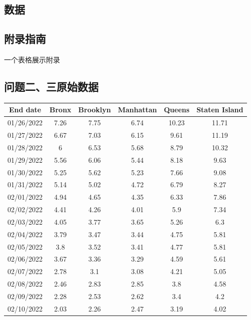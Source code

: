 \documentclass[withoutpreface,bwprint]{cumcmthesis} %
\begin{document}
\begin{appendices}
\section{数据}
\subsection{附录指南}
一个表格展示附录

\subsection{问题二、三原始数据}
\begin{table}[]
\begin{tabular}{cccccc}
\hline
End date   & Bronx & Brooklyn & Manhattan & Queens & Staten Island \\ \hline
01/26/2022 & 7.26  & 7.75     & 6.74      & 10.23  & 11.71         \\
01/27/2022 & 6.67  & 7.03     & 6.15      & 9.61   & 11.19         \\
01/28/2022 & 6     & 6.53     & 5.68      & 8.79   & 10.32         \\
01/29/2022 & 5.56  & 6.06     & 5.44      & 8.18   & 9.63          \\
01/30/2022 & 5.25  & 5.62     & 5.23      & 7.66   & 9.08          \\
01/31/2022 & 5.14  & 5.02     & 4.72      & 6.79   & 8.27          \\
02/01/2022 & 4.94  & 4.65     & 4.35      & 6.33   & 7.86          \\
02/02/2022 & 4.41  & 4.26     & 4.01      & 5.9    & 7.34          \\
02/03/2022 & 4.05  & 3.77     & 3.65      & 5.26   & 6.3           \\
02/04/2022 & 3.79  & 3.47     & 3.44      & 4.75   & 5.81          \\
02/05/2022 & 3.8   & 3.52     & 3.41      & 4.77   & 5.81          \\
02/06/2022 & 3.67  & 3.36     & 3.29      & 4.59   & 5.61          \\
02/07/2022 & 2.78  & 3.1      & 3.08      & 4.21   & 5.05          \\
02/08/2022 & 2.46  & 2.83     & 2.85      & 3.8    & 4.58          \\
02/09/2022 & 2.28  & 2.53     & 2.62      & 3.4    & 4.2           \\
02/10/2022 & 2.03  & 2.26     & 2.47      & 3.19   & 4.02          \\

\end{tabular}
\end{table}
\end{appendices}
\end{document}
